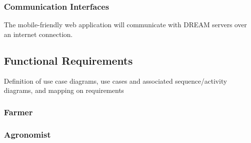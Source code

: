 \subsubsection{Communication Interfaces}
The mobile-friendly web application will communicate with DREAM servers over an internet connection. 

\subsection{Functional Requirements}
Definition of use case diagrams, use cases and associated sequence/activity diagrams, and mapping on requirements

\setcounter{usecase_counter}{1}



\subsubsection{Farmer}









\subsubsection{Agronomist}














